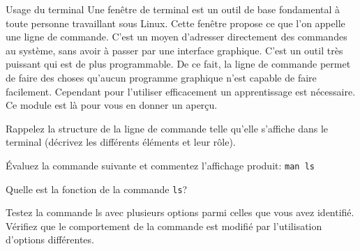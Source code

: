 \begin{exercice}
  \begin{exercicelet}{Usage du terminal}
    Une fenêtre de terminal est un outil de base fondamental à toute
    personne travaillant sous Linux. Cette fenêtre propose ce que l'on
    appelle une ligne de commande. C'est un moyen d'adresser directement
    des commandes au système, sans avoir à passer par une interface
    graphique. C'est un outil très puissant qui est de plus
    programmable.  De ce fait, la ligne de commande permet de faire des
    choses qu'aucun programme graphique n'est capable de faire
    facilement. Cependant pour l'utiliser efficacement un apprentissage
    est nécessaire. Ce module est là pour vous en donner un aperçu.
    \begin{questions}
    \item Rappelez la structure de la ligne de commande telle qu'elle
      s'affiche dans le terminal (décrivez les différents éléments et
      leur rôle).
    \item Évaluez la commande suivante et commentez l'affichage produit:
      \texttt{man ls}
    \item Quelle est la fonction de la commande \texttt{ls}?
    \item Testez la commande ls avec plusieurs options parmi celles que
      vous avez identifié. Vérifiez que le comportement de la commande
      est modifié par l'utilisation d'options différentes.
    \end{questions}
  \end{exercicelet}
\end{exercice}

